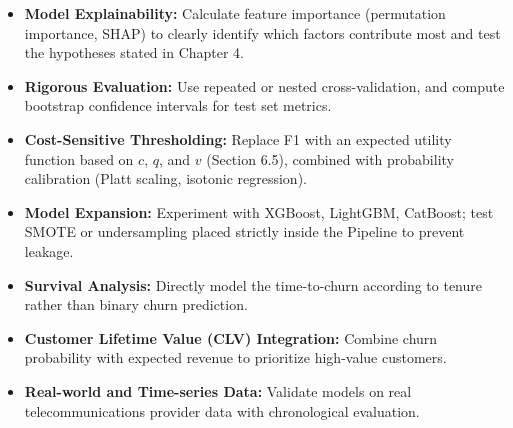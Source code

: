 \begin{itemize}
    \item \textbf{Model Explainability:} Calculate feature importance (permutation importance, SHAP) to clearly identify which factors contribute most and test the hypotheses stated in Chapter 4.
    \item \textbf{Rigorous Evaluation:} Use repeated or nested cross-validation, and compute bootstrap confidence intervals for test set metrics.
    \item \textbf{Cost-Sensitive Thresholding:} Replace F1 with an expected utility function based on $c$, $q$, and $v$ (Section 6.5), combined with probability calibration (Platt scaling, isotonic regression).
    \item \textbf{Model Expansion:} Experiment with XGBoost, LightGBM, CatBoost; test SMOTE or undersampling placed strictly inside the Pipeline to prevent leakage.
    \item \textbf{Survival Analysis:} Directly model the time-to-churn according to tenure rather than binary churn prediction.
    \item \textbf{Customer Lifetime Value (CLV) Integration:} Combine churn probability with expected revenue to prioritize high-value customers.
    \item \textbf{Real-world and Time-series Data:} Validate models on real telecommunications provider data with chronological evaluation.
\end{itemize}
